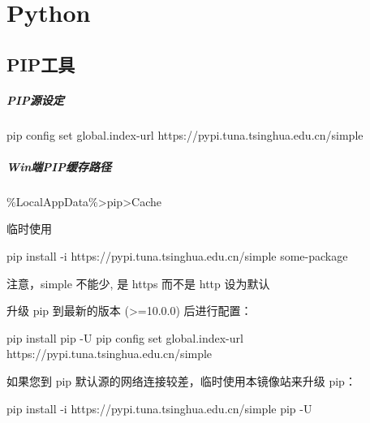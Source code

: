 \chapter{Python}

\section{PIP工具}
\paragraph{PIP源设定} pip config set global.index-url https://pypi.tuna.tsinghua.edu.cn/simple

\paragraph{Win端PIP缓存路径} \%LocalAppData\%>pip>Cache

临时使用

pip install -i https://pypi.tuna.tsinghua.edu.cn/simple some-package

注意，simple 不能少, 是 https 而不是 http
设为默认

升级 pip 到最新的版本 (>=10.0.0) 后进行配置：

pip install pip -U
pip config set global.index-url https://pypi.tuna.tsinghua.edu.cn/simple

如果您到 pip 默认源的网络连接较差，临时使用本镜像站来升级 pip：

pip install -i https://pypi.tuna.tsinghua.edu.cn/simple pip -U
